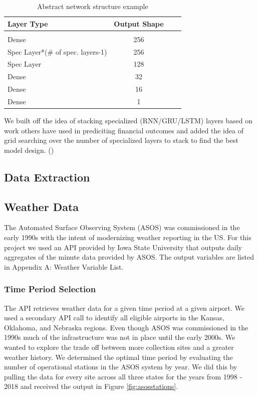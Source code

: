 \documentclass[twoside,11pt]{article}
\begin{document}
\begin{table}[htbp]
	\centering
	\begin{tabular}{lclc}
		Layer Type & Output Shape \\
		\hline \\[-11pt]
		Dense & 256 \\
		Spec Layer*(\# of spec. layers-1) & 256\\
		Spec Layer & 128\\
		Dense & 32\\
		Dense & 16\\
		Dense & 1\\
		\hline
	\end{tabular}
	\caption{Abstract network structure example}\label{tab:networkstructure}
\end{table}


We built off the idea of stacking specialized (RNN/GRU/LSTM) layers based on work others have used in prediciting financial outcomes and added the idea of grid searching over the number of specialized layers to stack to find the best model design. (\cite{benjikcf})

\subsection{Data Extraction}

\subsection{Weather Data}
	The Automated Surface Observing System (ASOS) was commissioned in the early 1990s with the intent of modernizing weather reporting in the US. For this project we used an API provided by Iowa State University that outputs daily aggregates of the minute data provided by ASOS. The output variables are listed in Appendix A: Weather Variable List.
	
	\subsubsection{Time Period Selection}
	The API retrieves weather data for a given time period at a given airport. We used a secondary API call to identify all eligible airports in the Kansas, Oklahoma, and Nebraska regions. Even though ASOS was commissioned in the 1990s much of the infrastructure was not in place until the early 2000s. We wanted to explore the trade off between more collection sites and a greater weather history. We determined the optimal time period by evaluating the number of operational stations in the ASOS system by year. We did this by pulling the data for every site across all three states for the years from 1998 - 2018 and received the output in Figure \ref{fig:asosstations}. 
	
\end{document}
